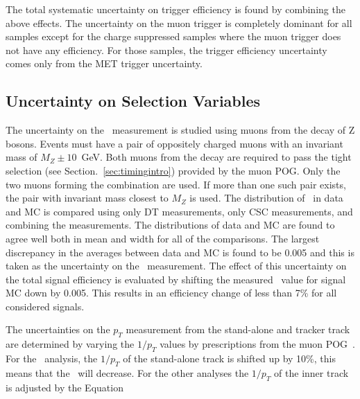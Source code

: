 The total systematic uncertainty on trigger efficiency is found by combining the above effects. 
The uncertainty on the muon trigger is completely dominant for all samples except for the charge suppressed samples where the muon trigger does not have any efficiency.
For those samples, the trigger efficiency uncertainty comes only from the MET trigger uncertainty.


\subsection{Uncertainty on Selection Variables}

The uncertainty on the \invbeta\ measurement is studied using muons from the decay of Z bosons. 
Events must have a pair of oppositely charged muons with an invariant mass of $M_Z \pm 10$~GeV. 
Both muons from the decay are required to pass the tight selection (see Section.~\ref{sec:timingintro}) provided by the muon POG.
Only the two muons forming the combination
are used. If more than one such pair exists, the pair with invariant mass closest to $M_Z$ is used. 
The distribution of \invbeta\ in data and MC is compared using only DT measurements, only CSC measurements, and combining the measurements.
The distributions of data and MC are found to agree well both in mean and width for all of the comparisons.
The largest discrepancy in the averages between data and MC is found to be 0.005 and this is taken as the uncertainty on the \invbeta\ measurement.
The effect of this uncertainty on the total signal efficiency is evaluated by shifting the measured \invbeta\ value for signal MC down by 0.005.
This results in an efficiency change of less than 7\% for all considered signals.

The uncertainties on the $p_T$ measurement from the stand-alone and tracker track are determined by
varying the $1/p_T$ values by prescriptions from the muon POG~\cite{2012JInst...7P0002T}. For the \muononly\
analysis, the $1/p_T$ of the stand-alone track is shifted up by 10\%, this means that the \pt\ will decrease.
For the other analyses the $1/p_T$ of the inner track is adjusted by the Equation

